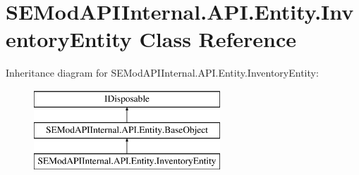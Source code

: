 \hypertarget{class_s_e_mod_a_p_i_internal_1_1_a_p_i_1_1_entity_1_1_inventory_entity}{}\section{S\+E\+Mod\+A\+P\+I\+Internal.\+A\+P\+I.\+Entity.\+Inventory\+Entity Class Reference}
\label{class_s_e_mod_a_p_i_internal_1_1_a_p_i_1_1_entity_1_1_inventory_entity}
Inheritance diagram for S\+E\+Mod\+A\+P\+I\+Internal.\+A\+P\+I.\+Entity.\+Inventory\+Entity\+:\begin{figure}[H]
\begin{center}
\leavevmode
\includegraphics[height=3.000000cm]{class_s_e_mod_a_p_i_internal_1_1_a_p_i_1_1_entity_1_1_inventory_entity}
\end{center}
\end{figure}
